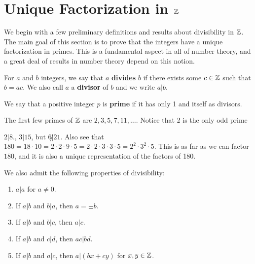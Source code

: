 
\section{Unique Factorization in $\mathbb{Z}$}
\hspace{10mm}

We begin with a few preliminary definitions and results about divisibility in $\mathbb{Z}$. The main goal of this section is to prove that the integers have a unique factorization in primes. This is a fundamental aspect in all of number theory, and a great deal of results in number theory depend on this notion.

\begin{definition}
    For $a$ and $b$ integers, we say that $a$ \textbf{divides} $b$ if there exists some $c \in \mathbb{Z}$ such that $b=ac$. We also call $a$ a \textbf{divisor} of $b$ and we write $a|b$.
\end{definition}

\begin{definition}
    We say that a positive integer $p$ is \textbf{prime} if it has only 1 and itself as divisors.
\end{definition}

\begin{example}
    The first few primes of $\mathbb{Z}$ are $2,3,5,7,11, \dots$. Notice that 2 is the only odd prime
\end{example}

\begin{example}
    $2|8$., $3|15$, but $6\not| 21$. Also see that $180=18 \cdot 10=2 \cdot 2 \cdot 9 \cdot 5=2 \cdot 2 \cdot 3 \cdot 3 \cdot 5=2^2 \cdot 3^2 \cdot 5$. This is as far as we can factor $180$, and it is also a unique representation of the factors of 180.
\end{example}

We also admit the following properties of divisibility:
    \begin{enumerate}[label=(\arabic*)]
        \item $a|a$ for $a \neq 0$.
        
        \item If $a|b$ and $b|a$, then $a=\pm{b}$.
        
        \item If $a|b$ and $b|c$, then $a|c$.
        
        \item If $a|b$ and $c|d$, then $ac|bd$.
        
        \item If $a|b$ and $a|c$, then $a|(bx+cy)$ for $x,y \in \mathbb{Z}$.
    \end{enumerate}

